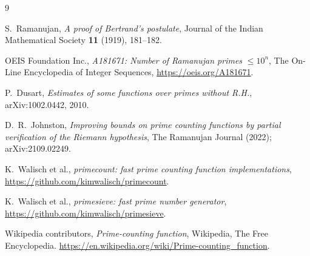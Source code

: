 \documentclass[11pt]{amsart}
\begin{document}
\begin{thebibliography}{9}

S.~Ramanujan, \emph{A proof of Bertrand's postulate}, Journal of the
Indian Mathematical Society \textbf{11} (1919), 181--182.

OEIS Foundation Inc., \emph{A181671: Number of Ramanujan primes} $\leq
10^n$, The On-Line Encyclopedia of Integer Sequences,
\url{https://oeis.org/A181671}.

P.~Dusart, \emph{Estimates of some functions over primes without R.H.},
arXiv:1002.0442, 2010.

D.~R.~Johnston, \emph{Improving bounds on prime counting functions by
partial verification of the Riemann hypothesis}, The Ramanujan Journal
(2022); arXiv:2109.02249.

K.~Walisch et al., \emph{primecount: fast prime counting function
implementations}, \url{https://github.com/kimwalisch/primecount}.

K.~Walisch et al., \emph{primesieve: fast prime number generator},
\url{https://github.com/kimwalisch/primesieve}.

Wikipedia contributors, \emph{Prime-counting function}, Wikipedia, The
Free Encyclopedia. \url{https://en.wikipedia.org/wiki/Prime-counting_function}.

\end{thebibliography}
\end{document}
